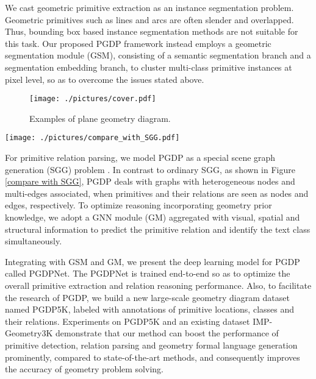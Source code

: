 \documentclass{article}
\begin{document}
We cast geometric primitive extraction as an instance
segmentation problem. Geometric primitives such as lines and arcs are often slender and overlapped. Thus, bounding box based instance segmentation methods \cite{He2018,Neven2019,Ying2021} are not suitable for this task. Our proposed PGDP framework instead employs a geometric segmentation module (GSM), consisting of a semantic segmentation branch and a segmentation embedding branch, to cluster multi-class primitive instances at pixel level, so as to overcome the issues stated above.

\begin{figure}[t]
    \begin{center}
    \texttt{[image: ./pictures/cover.pdf]} 
    \end{center}
    \caption{Examples of plane geometry diagram.}
    \label{cover}
\end{figure}

\begin{figure*}[htbp]
    \begin{center}
    \texttt{[image: ./pictures/compare\_with\_SGG.pdf]} 
    \end{center}
    \caption{Comparison between tasks of SGG (first image) and PGDP (next three images). Relation tuples are shown below each image. `P\#',`L\#',`C\#',`T\#' and `S\#' denote instances of point, line, circle, text and symbol, respectively.}
    \label{compare with SGG}
\end{figure*}

For primitive relation parsing, we model PGDP as a special scene graph generation (SGG) problem \cite{Xu2017,Liu2021}. In contrast to ordinary SGG, as shown in Figure \ref{compare with SGG}, PGDP deals with graphs with heterogeneous nodes and multi-edges associated, when primitives and their relations are seen as nodes and edges, respectively. To optimize reasoning incorporating geometry prior knowledge, we adopt a GNN module (GM) aggregated with visual, spatial and structural information to predict the primitive relation and identify the text class simultaneously. 

Integrating with GSM and GM, we present the deep learning model for PGDP called PGDPNet. The PGDPNet is trained end-to-end so as to optimize the overall primitive extraction and relation reasoning performance. Also, to facilitate the research of PGDP, we build a new large-scale geometry diagram dataset named PGDP5K, labeled with annotations of primitive locations, classes and their relations. Experiments on PGDP5K and an existing dataset IMP-Geometry3K demonstrate that our method can boost the performance of primitive detection, relation parsing and geometry formal language generation prominently, compared to state-of-the-art methods, and consequently improves the accuracy of geometry problem solving.
\end{document}
